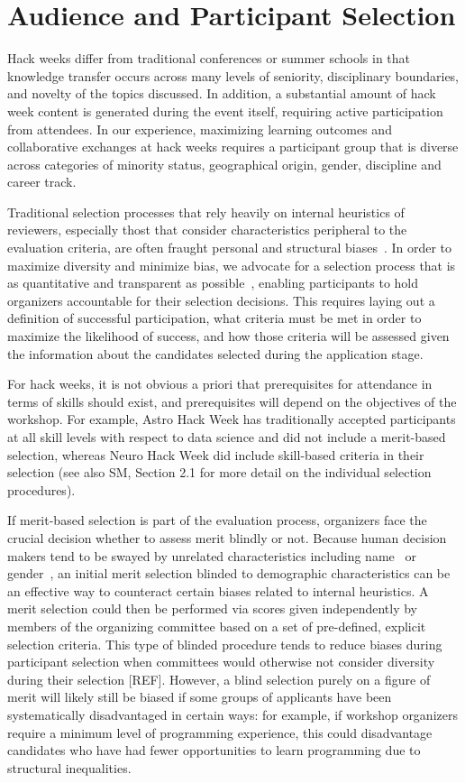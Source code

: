 \section*{Audience and Participant Selection}

Hack weeks differ from traditional conferences or summer schools in that knowledge transfer occurs across many levels of seniority, disciplinary boundaries, and novelty of the topics discussed.
In addition, a substantial amount of hack week content is generated during the event itself, requiring active participation from attendees.
In our experience, maximizing learning outcomes and collaborative exchanges at hack weeks requires a participant group that is diverse across categories of minority status, geographical origin, gender, discipline and career track. 

Traditional selection processes that rely heavily on internal heuristics of reviewers, especially thost that consider characteristics peripheral to the evaluation criteria, are often fraught personal and structural biases~\cite[e.g.][]{sunstein2015wiser}. 
In order to maximize diversity and minimize bias, we advocate for a selection process that is as quantitative and transparent as possible~\cite{sunstein2015wiser}, enabling participants to hold organizers accountable for their selection decisions.
This requires laying out a definition of successful participation, what criteria must be met in order to maximize the likelihood of success, and how those criteria will be assessed given the information about the candidates selected during the application stage.  

For hack weeks, it is not obvious a priori that prerequisites for attendance in terms of skills should exist, and prerequisites will depend on the objectives of the workshop. For example, Astro Hack Week has traditionally accepted participants at all skill levels with respect to data science and did not include a merit-based selection, whereas Neuro Hack Week did include skill-based criteria in their selection (see also SM, Section 2.1 for more detail on the individual selection procedures). 

If merit-based selection is part of the evaluation process, organizers face the crucial decision whether to assess merit blindly or not. Because human decision makers tend to be swayed by unrelated characteristics including name~\cite{bertrand2004} or gender~\cite{mossracusin2012}, an initial merit selection blinded to demographic characteristics can be an effective way to counteract certain biases related to internal heuristics. A merit selection could then be performed via scores given independently by members of the organizing committee based on a set of pre-defined, explicit selection criteria. This type of blinded procedure tends to reduce biases during participant selection when committees would otherwise not consider diversity during their selection [REF]. However, a blind selection purely on a figure of merit will likely still be biased if some groups of applicants have been systematically disadvantaged in certain ways: for example, if workshop organizers require a minimum level of programming experience, this could disadvantage candidates who have had fewer opportunities to learn programming due to structural inequalities. 

